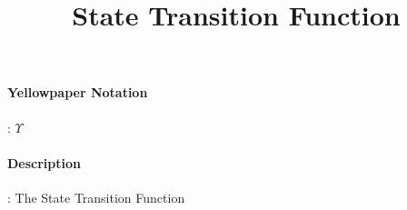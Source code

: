 \documentclass[10pt,a4paper,oneside]{scrartcl}
\title{State Transition Function}
\date{}
\begin{document}
\maketitle
\paragraph{Yellowpaper Notation}: $\Upsilon$
\paragraph{Description}: The State Transition Function 
\end{document}
